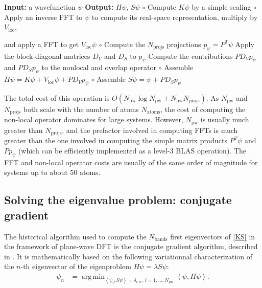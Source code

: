 \documentclass[11pt]{elsarticle}
\DeclareMathOperator*{\argmin}{arg\,min}
\newcommand{\lela}{\left \langle}
\newcommand{\rira}{\right \rangle}
\newcommand{\npw}{\ensuremath{N_{\text{pw}}}\xspace}
\newcommand{\nprojs}{\ensuremath{N_{\text{projs}}}\xspace}
\newcommand{\nband}{\ensuremath{N_{\text{bands}}}\xspace}
\newcommand{\natom}{\ensuremath{N_{\text{atoms}}}\xspace}
\begin{document}
\begin{framed}

  \begin{algorithm}[H]
    \caption{Computation of $H \psi, S \psi$}
    \begin{algorithmic}
      \STATE \textbf{Input:} a wavefunction $\psi$
      \STATE \textbf{Output:} $H\psi$, $S \psi$
      \STATE $\circ$ Compute $K \psi$ by a simple scaling
      \STATE $\circ$ Apply an inverse FFT to $\psi$ to compute its real-space
      representation, multiply by $V_{\text{loc}}$,

      and apply a FFT
      to get $V_{\text{loc}} \psi$
      \STATE $\circ$ Compute the \nprojs projections $p_{\psi} = P^{T} \psi$
      \STATE Apply the block-diagonal matrices $D_{V}$ and $D_{S}$
      to $p_{\psi}$
      \STATE Compute the contributions $P D_{V} p_{\psi}$ and $P
      D_{S} p_{\psi}$ to the nonlocal and overlap operator
      \STATE $\circ$ Assemble $H \psi = K \psi + V_{\text{loc}} \psi + P
      D_{V} p_{\psi}$
      \STATE $\circ$ Assemble $S \psi = \psi + P D_{S} p_{\psi}$
    \end{algorithmic}
    \label{alg:h}
  \end{algorithm}
\end{framed}
The total cost of this operation is $O(\npw \log \npw + \npw
\nprojs)$. As $\npw$ and $\nprojs$ both scale with the number of atoms
$\natom$, the cost of computing the non-local operator dominates for
large systems. However, \npw is usually much greater than \nprojs, and
the prefactor involved in computing FFTs is much greater than the one
involved in computing the simple matrix products $P^{T} \psi$ and $P
p_{\psi}$ (which can be efficiently implemented as a level-3 BLAS
operation). The FFT and non-local operator costs are usually of the
same order of magnitude for systems up to about 50 atoms.
\subsection{Solving the eigenvalue problem: conjugate gradient}
The historical algorithm used to compute the \nband first eigenvectors
of \eqref{KS} in the framework of plane-wave DFT is the conjugate
gradient algorithm, described in \cite{payne1992iterative,
  kresse1996efficient}. It is mathematically based on the following
variationnal characterization of the $n$-th eigenvector of the
eigenproblem $H \psi = \lambda S \psi$:
\begin{align*}
  \psi_{n} &= \argmin_{\lela \psi_{i}, S \psi\rira = \delta_{i,n},
    \; i = 1,\dots,\npw}
  \lela \psi, H \psi\rira.
\end{align*}
\end{document}
